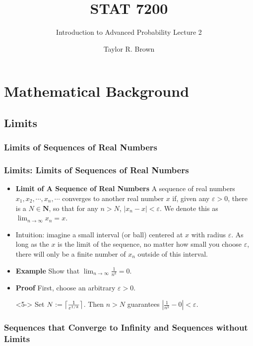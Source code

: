 \documentclass[handout]{beamer}
\title{STAT 7200}
\subtitle{Introduction to Advanced Probability \newline Lecture 2}
\author{Taylor R. Brown}
\institute{}
\date{}
\DeclarePairedDelimiter{\ceil}{\lceil}{\rceil}
\begin{document}
\frame{\titlepage}

\section[Outline]{}



\section{Mathematical Background}


\subsection{Limits}
\subsubsection{Limits of Sequences of Real Numbers}

\frame
{
  \frametitle{Limits: Limits of Sequences of Real Numbers}

  \begin{itemize}
  \item <1->  \textbf{Limit of A Sequence of Real Numbers} A sequence of real numbers $x_1,x_2,\cdots,x_n,\cdots $ converges to another real number $x$ if, given any $\varepsilon>0$, there is a $N\in\mathbf{N}$, so that for any $n>N$, $|x_n-x|<\varepsilon$. We denote this as $\lim_{n\rightarrow\infty} x_n=x$.
  \item <2->  Intuition: imagine a small interval (or ball) centered at $x$ with radius $\varepsilon$. As long as the $x$ is the limit of the sequence, no matter how small you choose $\varepsilon$, there will only be a finite number of $x_n$ outside of this interval.
  
      \item<3-> \textbf{Example} Show that $\lim_{n\rightarrow\infty}  \frac{1}{n^k}= 0.$

    \item<4-> \textbf{Proof} First, choose an arbitrary $\varepsilon>0$.     
    \item[]<5-> Set $N := \ceil[\big]{\frac{1}{\varepsilon^{1/k}}}$. Then $n > N$ guarantees  $|\frac{1}{n^k}-0|<\varepsilon$. 
    
    
  \end{itemize}
}

\subsubsection{Sequences that Converge to Infinity and Sequences without Limits}
\end{document}

